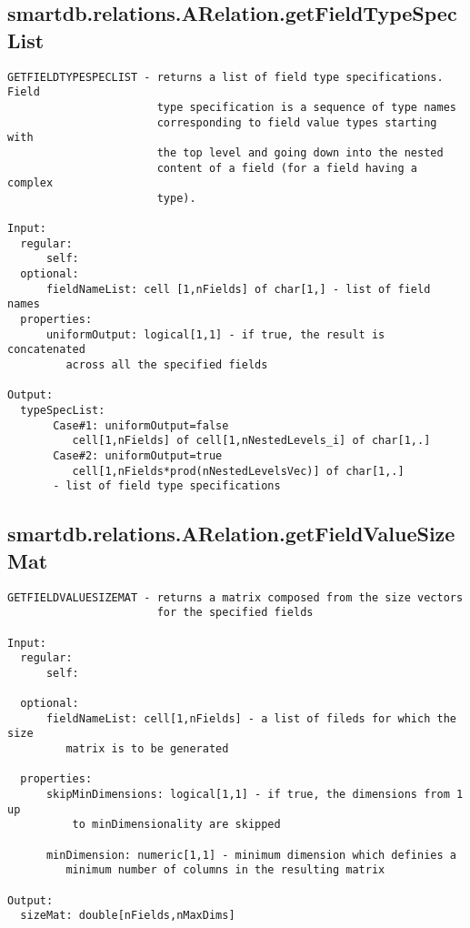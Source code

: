 \subsection{\texorpdfstring{smartdb.relations.ARelation.getFieldTypeSpecList}{getFieldTypeSpecList}}\label{method:smartdb.relations.ARelation.getFieldTypeSpecList}
\begin{verbatim}
GETFIELDTYPESPECLIST - returns a list of field type specifications. Field
                       type specification is a sequence of type names
                       corresponding to field value types starting with
                       the top level and going down into the nested
                       content of a field (for a field having a complex
                       type).

Input:
  regular:
      self:
  optional:
      fieldNameList: cell [1,nFields] of char[1,] - list of field names
  properties:
      uniformOutput: logical[1,1] - if true, the result is concatenated
         across all the specified fields

Output:
  typeSpecList:
       Case#1: uniformOutput=false
          cell[1,nFields] of cell[1,nNestedLevels_i] of char[1,.]
       Case#2: uniformOutput=true
          cell[1,nFields*prod(nNestedLevelsVec)] of char[1,.]
       - list of field type specifications
\end{verbatim}
\subsection{\texorpdfstring{smartdb.relations.ARelation.getFieldValueSizeMat}{getFieldValueSizeMat}}\label{method:smartdb.relations.ARelation.getFieldValueSizeMat}
\begin{verbatim}
GETFIELDVALUESIZEMAT - returns a matrix composed from the size vectors
                       for the specified fields

Input:
  regular:
      self:

  optional:
      fieldNameList: cell[1,nFields] - a list of fileds for which the size
         matrix is to be generated

  properties:
      skipMinDimensions: logical[1,1] - if true, the dimensions from 1 up
          to minDimensionality are skipped

      minDimension: numeric[1,1] - minimum dimension which definies a
         minimum number of columns in the resulting matrix

Output:
  sizeMat: double[nFields,nMaxDims]
\end{verbatim}
